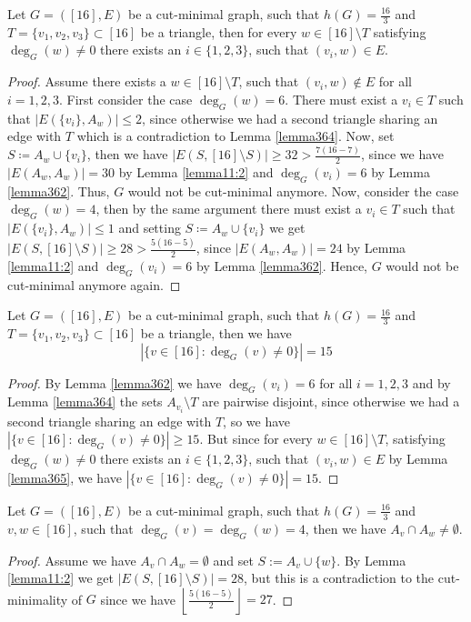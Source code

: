 \begin{lem}\label{lemma365}
Let \(G=([16],E)\) be a cut-minimal graph, such that \(h(G)=\frac{16}{3}\) and \(T=\{v_1,v_2,v_3\}\subset [16]\) be a triangle, then for every \(w\in [16]\setminus T\) satisfying \(\deg_G(w)\neq 0\) there exists an \(i\in\{1,2,3\}\), such that \((v_i,w)\in E\).
\begin{proof}
Assume there exists a \(w\in [16]\setminus T\), such that \((v_i,w)\notin E\) for all \(i=1,2,3\). First consider the case \(\deg_G(w)=6\). There must exist a \(v_i\in T\) such that \(|E(\{v_i\},A_w)|\leq 2\), since otherwise we had a second triangle sharing an edge with \(T\) which is a contradiction to Lemma \ref{lemma364}. Now, set \(S\coloneqq A_w\cup\{v_i\}\), then we have \(|E(S,[16]\setminus S)|\geq 32>\frac{7(16-7)}{2}\), since we have \(|E(A_w,A_w)|=30\) by Lemma \ref{lemma11:2} and \(\deg_G(v_i)=6\) by Lemma \ref{lemma362}. Thus, \(G\) would not be cut-minimal anymore. Now, consider the case \(\deg_G(w)=4\), then by the same argument there must exist a \(v_i\in T\) such that \(|E(\{v_i\},A_w)|\leq 1\) and setting \(S\coloneqq A_w\cup\{v_i\}\) we get \(|E(S,[16]\setminus S)|\geq 28>\frac{5(16-5)}{2}\), since \(|E(A_w,A_w)|=24\) by Lemma \ref{lemma11:2} and \(\deg_G(v_i)=6\) by Lemma \ref{lemma362}. Hence, \(G\) would not be cut-minimal anymore again.
\end{proof}
\end{lem}

\begin{lem}\label{lemma366}
Let \(G=([16],E)\) be a cut-minimal graph, such that \(h(G)=\frac{16}{3}\) and \(T=\{v_1,v_2,v_3\}\subset [16]\) be a triangle, then we have
\[
|\{v\in [16]:\deg_G(v)\neq 0\}|=15
\]
\begin{proof}
By Lemma \ref{lemma362} we have \(\deg_G(v_i)=6\) for all \(i=1,2,3\) and by Lemma \ref{lemma364} the sets \(A_{v_i}\setminus T\) are pairwise disjoint, since otherwise we had a second triangle sharing an edge with \(T\), so we have \(|\{v\in [16]:\deg_G(v)\neq 0\}|\geq 15\). But since for every \(w\in [16]\setminus T\), satisfying \(\deg_G(w)\neq 0\) there exists an \(i\in\{1,2,3\}\), such that \((v_i,w)\in E\) by Lemma \ref{lemma365}, we have \(|\{v\in [16]:\deg_G(v)\neq 0\}|=15\).
\end{proof}
\end{lem}

\begin{lem}\label{lemma367}
Let \(G=([16],E)\) be a cut-minimal graph, such that \(h(G)=\frac{16}{3}\) and \(v,w\in [16]\), such that \(\deg_G(v)=\deg_G(w)=4\), then we have \(A_v\cap A_w\neq\emptyset\).
\begin{proof}
Assume we have \(A_v\cap A_w=\emptyset\) and set \(S:=A_v\cup\{w\}\). By Lemma \ref{lemma11:2} we get \(|E(S,[16]\setminus S)|=28\), but this is a contradiction to the cut-minimality of \(G\) since we have \(\left\lfloor\frac{5(16-5)}{2}\right\rfloor=27\).
\end{proof}
\end{lem}

